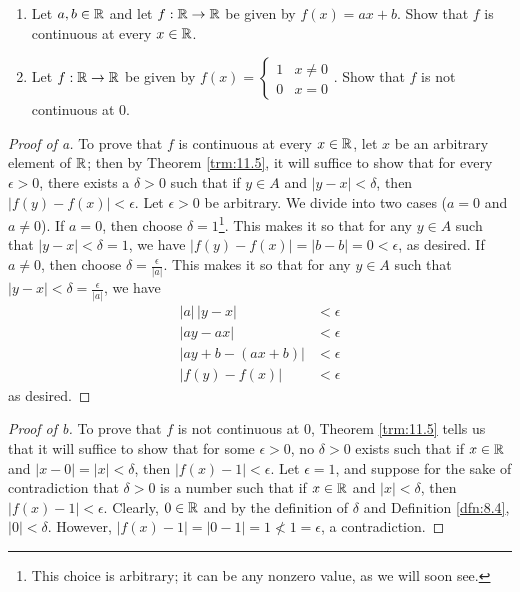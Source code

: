 \documentclass[../main.tex]{subfiles}
\begin{document}
\begin{exercise}\label{exr:11.6}\leavevmode
    \begin{enumerate}[label={\textup{(}\alph*\textup{)}}]
        \item Let $a,b\in\mathbb{R}$ and let $f:\mathbb{R}\to\mathbb{R}$ be given by $f(x)=ax+b$. Show that $f$ is continuous at every $x\in\mathbb{R}$.
        \item Let $f:\mathbb{R}\to\mathbb{R}$ be given by $
            f(x) =
            \begin{cases}
                1 & x\neq 0\\
                0 & x=0
            \end{cases}
        $. Show that $f$ is not continuous at 0.
    \end{enumerate}
    \begin{proof}[Proof of a]
        To prove that $f$ is continuous at every $x\in\mathbb{R}$, let $x$ be an arbitrary element of $\mathbb{R}$; then by Theorem \ref{trm:11.5}, it will suffice to show that for every $\epsilon>0$, there exists a $\delta>0$ such that if $y\in A$ and $|y-x|<\delta$, then $|f(y)-f(x)|<\epsilon$. Let $\epsilon>0$ be arbitrary. We divide into two cases ($a=0$ and $a\neq 0$). If $a=0$, then choose $\delta=1$\footnote{This choice is arbitrary; it can be any nonzero value, as we will soon see.}. This makes it so that for any $y\in A$ such that $|y-x|<\delta=1$, we have $|f(y)-f(x)|=|b-b|=0<\epsilon$, as desired. If $a\neq 0$, then choose $\delta=\frac{\epsilon}{|a|}$. This makes it so that for any $y\in A$ such that $|y-x|<\delta=\frac{\epsilon}{|a|}$, we have
        \begin{align*}
            |a|\, |y-x| &< \epsilon\\
            |ay-ax| &< \epsilon\\
            |ay+b-(ax+b)| &< \epsilon\\
            |f(y)-f(x)| &< \epsilon
        \end{align*}
        as desired.
    \end{proof}
    \begin{proof}[Proof of b]
        To prove that $f$ is not continuous at $0$, Theorem \ref{trm:11.5} tells us that it will suffice to show that for some $\epsilon>0$, no $\delta>0$ exists such that if $x\in\mathbb{R}$ and $|x-0|=|x|<\delta$, then $|f(x)-1|<\epsilon$. Let $\epsilon=1$, and suppose for the sake of contradiction that $\delta>0$ is a number such that if $x\in\mathbb{R}$ and $|x|<\delta$, then $|f(x)-1|<\epsilon$. Clearly, $0\in\mathbb{R}$ and by the definition of $\delta$ and Definition \ref{dfn:8.4}, $|0|<\delta$. However, $|f(x)-1|=|0-1|=1\not<1=\epsilon$, a contradiction.
    \end{proof}
\end{exercise}
\end{document}
